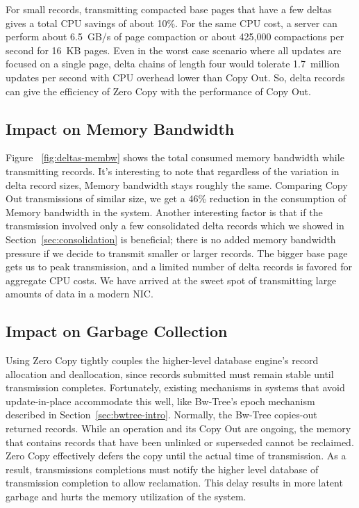 For small records, transmitting compacted base pages that have a few deltas gives
a total CPU savings of about 10\%. For the same CPU cost, a server can perform
about 6.5~GB/s of page compaction or about 425,000 compactions per second for
16~KB pages. Even in the worst case scenario where all updates are focused on a
single page, delta chains of length four would tolerate 1.7~million updates per
second with CPU overhead lower than Copy Out. So, delta records can give the
efficiency of Zero Copy with the performance of Copy Out.


\subsection{Impact on Memory Bandwidth}
Figure ~\ref{fig:deltas-membw} shows the total consumed memory bandwidth while 
transmitting records. It's interesting to note that regardless of the variation in 
delta record sizes, Memory bandwidth stays roughly the same. Comparing Copy Out 
transmissions of similar size, we get a 46\% reduction in the consumption of 
Memory bandwidth in the system. Another interesting factor is that if the transmission 
involved only a few consolidated delta records which we showed in Section~\ref{sec:consolidation} is 
beneficial; there is no added memory bandwidth pressure if we decide to transmit smaller 
or larger records. The bigger base page gets us to peak transmission, and a limited number of 
delta records is favored for aggregate CPU costs. We have arrived at the sweet spot of 
transmitting large amounts of data in a modern NIC.


\subsection{Impact on Garbage Collection}

Using Zero Copy tightly couples the higher-level database engine's record
allocation and deallocation, since records submitted must remain stable until
transmission completes. Fortunately, existing mechanisms in systems that avoid
update-in-place accommodate this well, like Bw-Tree's epoch mechanism described
in Section~\ref{sec:bwtree-intro}. Normally, the Bw-Tree copies-out returned records.
While an operation and its Copy Out are ongoing, the memory that contains records
that have been unlinked or superseded cannot be reclaimed. Zero Copy
effectively defers the copy until the actual time of transmission. As a result,
transmissions completions must notify the higher level database of transmission
completion to allow reclamation. This delay results in more latent garbage and
hurts the memory utilization of the system.


